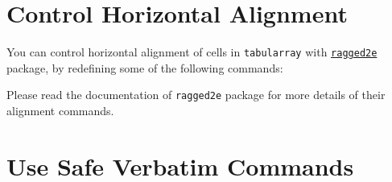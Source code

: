 \documentclass[oneside]{book}
\begin{document}
\section{Control Horizontal Alignment}

You can control horizontal alignment of cells in \texttt{tabularray} with
\href{https://www.ctan.org/pkg/ragged2e}{\texttt{ragged2e}} package,
by redefining some of the following commands:

\begin{codehigh}
\RenewDocumentCommand\TblrAlignBoth{}{\justifying}
\RenewDocumentCommand\TblrAlignLeft{}{\RaggedRight}
\RenewDocumentCommand\TblrAlignCenter{}{\Centering}
\RenewDocumentCommand\TblrAlignRight{}{\RaggedLeft}
\end{codehigh}

Please read the documentation of \texttt{ragged2e} package for more details of
their alignment commands.

\section{Use Safe Verbatim Commands}%
\label{sec:fakeverb}
\end{document}
